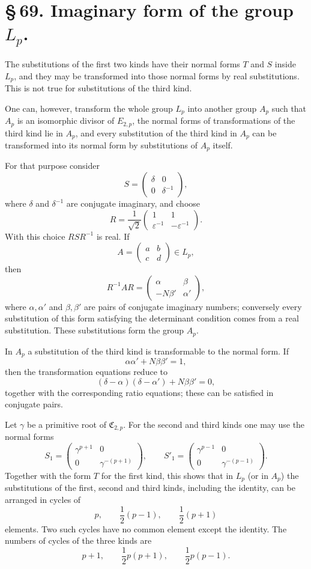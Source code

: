 \documentclass[11pt]{article}
\providecommand{\mat}[4]{\begin{pmatrix}#1&#2\\#3&#4\end{pmatrix}}
\providecommand{\mat}[4]{\begin{pmatrix}#1&#2\\#3&#4\end{pmatrix}}
\providecommand{\Cfield}{\mathfrak C}
\providecommand{\mat}[1]{\begin{pmatrix}#1\end{pmatrix}}
\begin{document}
\section*{\S\,69. Imaginary form of the group $L_p$.}

The substitutions of the first two kinds have their normal forms $T$ and $S$ inside $L_p$, and they may be transformed into those normal forms by real substitutions. This is not true for substitutions of the third kind.

One can, however, transform the whole group $L_p$ into another group $A_p$ such that $A_p$ is an isomorphic divisor of $E_{2,p}$, the normal forms of transformations of the third kind lie in $A_p$, and every substitution of the third kind in $A_p$ can be transformed into its normal form by substitutions of $A_p$ itself.

For that purpose consider
\[
 S=\mat{\delta}{0}{0}{\delta^{-1}},
\]
where $\delta$ and $\delta^{-1}$ are conjugate imaginary, and choose
\begin{equation}
 R=\frac{1}{\sqrt2}\mat{1}{1}{\varepsilon^{-1}}{-\varepsilon^{-1}}.
 \tag{1}
\end{equation}
With this choice $RSR^{-1}$ is real. If
\[
 A=\mat{a}{b}{c}{d}\in L_p,
\]
then
\begin{equation}
 R^{-1}AR=
 \mat{\alpha}{\beta}{-N\beta'}{\alpha'},
 \tag{2}
\end{equation}
where $\alpha,\alpha'$ and $\beta,\beta'$ are pairs of conjugate imaginary numbers; conversely every substitution of this form satisfying the determinant condition comes from a real substitution. These substitutions form the group $A_p$.

In $A_p$ a substitution of the third kind is transformable to the normal form. If
\begin{equation}
 \alpha\alpha'+N\beta\beta'=1,
 \tag{3}
\end{equation}
then the transformation equations reduce to
\begin{equation}
 (\delta-\alpha)(\delta-\alpha')+N\beta\beta'=0,
 \tag{4}
\end{equation}
together with the corresponding ratio equations; these can be satisfied in conjugate pairs.

Let $\gamma$ be a primitive root of $\Cfield_{2,p}$. For the second and third kinds one may use the normal forms
\begin{equation}
 S_1=\mat{\gamma^{p+1}}{0}{0}{\gamma^{-(p+1)}},
 \qquad
 S'_1=\mat{\gamma^{p-1}}{0}{0}{\gamma^{-(p-1)}}.
 \tag{5}
\end{equation}
Together with the form $T$ for the first kind, this shows that in $L_p$ (or in $A_p$) the substitutions of the first, second and third kinds, including the identity, can be arranged in cycles of
\[
 p,
 \qquad \frac12(p-1),
 \qquad \frac12(p+1)
\]
elements. Two such cycles have no common element except the identity. The numbers of cycles of the three kinds are
\begin{equation}
 p+1,
 \qquad \frac12p(p+1),
 \qquad \frac12p(p-1).
 \tag{6}
\end{equation}
\end{document}
